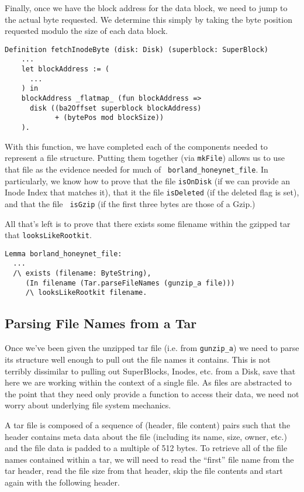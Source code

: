 \documentclass[nocopyrightspace]{sigplanconf}
\begin{document}
Finally, once we have the block address for the data block, we need to jump to
the actual byte requested. We determine this simply by taking the byte
position requested modulo the size of each data block.

\begin{lstlisting}
Definition fetchInodeByte (disk: Disk) (superblock: SuperBlock)
    ...
    let blockAddress := (
      ...
    ) in
    blockAddress _flatmap_ (fun blockAddress =>
      disk ((ba2Offset superblock blockAddress) 
            + (bytePos mod blockSize))
    ).
\end{lstlisting}

With this function, we have completed each of the components needed to
represent a file structure. Putting them together (via {\tt mkFile}) allows us
to use that file as the evidence needed for much of {\tt
borland\_honeynet\_file}. In particularly, we know how to prove that the file
{\tt isOnDisk} (if we can provide an Inode Index that matches it), that it the
file {\tt isDeleted} (if the deleted flag is set), and that the file {\tt
isGzip} (if the first three bytes are those of a Gzip.)


All that's left is to prove that there exists some filename within the gzipped
tar that {\tt looksLikeRootkit}.

\begin{lstlisting}
Lemma borland_honeynet_file:
  ...
  /\ exists (filename: ByteString),
     (In filename (Tar.parseFileNames (gunzip_a file)))
     /\ looksLikeRootkit filename.
\end{lstlisting}

\subsection{Parsing File Names from a Tar}
Once we've been given the unzipped tar file (i.e. from {\tt gunzip\_a}) we
need to parse its structure well enough to pull out the file names it
contains. This is not terribly dissimilar to pulling out SuperBlocks, Inodes,
etc. from a Disk, save that here we are working within the context of a single
file. As files are abstracted to the point that they need only provide a
function to access their data, we need not worry about underlying file system
mechanics.

A tar file is composed of a sequence of (header, file content) pairs such that
the header contains meta data about the file (including its name, size, owner,
etc.) and the file data is padded to a multiple of 512 bytes. To retrieve all
of the file names contained within a tar, we will need to read the ``first''
file name from the tar header, read the file size from that header, skip the
file contents and start again with the following header.
\end{document}
